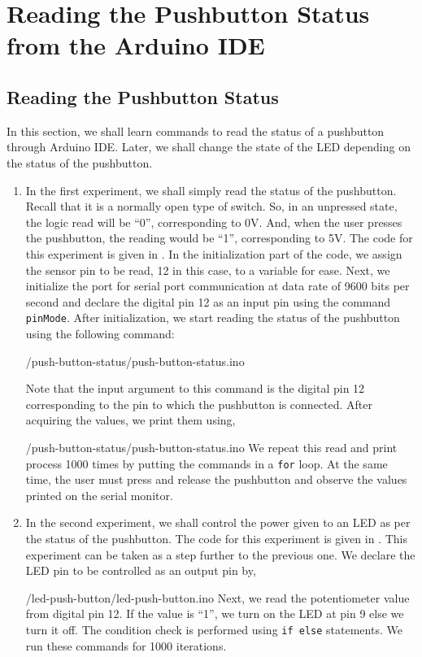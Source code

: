 \section{Reading the Pushbutton Status from the Arduino IDE}
\subsection{Reading the Pushbutton Status}
In this section, we shall learn commands to read the status of a
pushbutton through Arduino IDE. Later, we shall change the state of
the LED depending on the status of the pushbutton. 
\begin{enumerate}
\item In the first experiment, we shall simply read the status of the
  pushbutton. Recall that it is a normally open type of switch. So, in
  an unpressed state, the logic read will be ``0'', corresponding to
  0V. And, when the user presses the pushbutton, the reading would be
  ``1'', corresponding to 5V. The code for this experiment is given in
  . In the initialization part of the code, we
  assign the sensor pin to be read, 12 in this case, to a variable for
  ease. Next, we initialize the port for serial port communication at
  data rate of 9600 bits per second and declare the digital pin 12 as an input pin using the command {\tt pinMode}. After initialization, we start reading the status of the pushbutton using the following command:
  
  {\LocPushardcode/push-button-status/push-button-status.ino}

  Note that the input argument to this command is the digital pin 12
  corresponding to the pin to which the pushbutton is connected.  After
  acquiring the values, we print them using,
  
  {\LocPushardcode/push-button-status/push-button-status.ino} We
  repeat this read and print process 1000 times by putting the
  commands in a {\tt for} loop. At the same time, the user must press
  and release the pushbutton and observe the values printed on the
serial monitor.

\item In the second experiment, we shall control the power given to an
  LED as per the status of the pushbutton. The code for this
  experiment is given in . This experiment can be
  taken as a step further to the previous one. We declare the LED pin
  to be controlled as an output pin by,
  
  {\LocPushardcode/led-push-button/led-push-button.ino} Next, we read
  the potentiometer value from digital pin 12. If the value is ``1'',
  we turn on the LED at pin 9 else we turn it off. The
  condition check is performed using {\tt if else} statements. We run
  these commands for 1000 iterations.
\end{enumerate}

